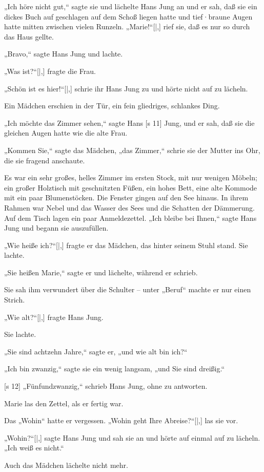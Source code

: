„Ich höre nicht gut,“ sagte sie und lächelte Hans
Jung an und er sah, daß sie ein dickes Buch auf­
geschlagen auf dem Schoß liegen hatte und tief·braune
Augen hatte mitten zwischen vielen Runzeln. „Marie!“[|,]
rief sie, daß es nur so durch das Haus gellte.

„Bravo,“ sagte Hans Jung und lachte.

„Was ist?“[|,] fragte die Frau.

„Schön ist es hier!“[|,] schrie ihr Hans Jung zu und
hörte nicht auf zu lächeln.

Ein Mädchen erschien in der Tür, ein fein­
gliedriges, schlankes Ding.

„Ich möchte das Zimmer sehen,“ sagte Hans
[s 11]
Jung, und er sah, daß sie die gleichen Augen hatte
wie die alte Frau.

„Kommen Sie,“ sagte das Mädchen, „das
Zimmer,“ schrie sie der Mutter ins Ohr, die sie
fragend anschaute.

Es war ein sehr großes, helles Zimmer im ersten
Stock, mit nur wenigen Möbeln; ein großer Holztisch
mit geschnitzten Füßen, ein hohes Bett, eine alte
Kommode mit ein paar Blumenstöcken. Die Fenster
gingen auf den See hinaus. In ihrem Rahmen war
Nebel und das Wasser des Sees und die Schatten
der Dämmerung. Auf dem Tisch lagen ein paar
Anmeldezettel. „Ich bleibe bei Ihnen,“ sagte Hans
Jung und begann sie auszufüllen.

„Wie heiße ich?“[|,] fragte er das Mädchen, das
hinter seinem Stuhl stand. Sie lachte.

„Sie heißen Marie,“ sagte er und lächelte, während
er schrieb.

Sie sah ihm verwundert über die Schulter –
unter „Beruf“ machte er nur einen Strich.

„Wie alt?“[|,] fragte Hans Jung.

Sie lachte.

„Sie sind achtzehn Jahre,“ sagte er, „und wie
alt bin ich?“

„Ich bin zwanzig,“ sagte sie ein wenig langsam,
„und Sie sind dreißig.“

[s 12]
„Fünfundzwanzig,“ schrieb Hans Jung, ohne zu
antworten.

Marie las den Zettel, als er fertig war.

Das „Wohin“ hatte er vergessen. „Wohin geht
Ihre Abreise?“[|,] las sie vor.

„Wohin?“[|,] sagte Hans Jung und sah sie an und
hörte auf einmal auf zu lächeln. „Ich weiß es nicht.“

Auch das Mädchen lächelte nicht mehr.

